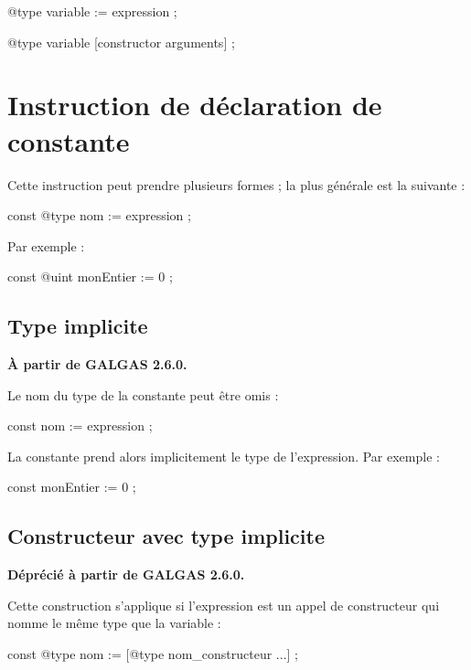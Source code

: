{
\begin{galgascode}
@type variable := expression ;
\end{galgascode}
}

{
\begin{galgascode}
@type variable [constructor arguments] ;
\end{galgascode}
}


\section{Instruction de déclaration de constante}

Cette instruction peut prendre plusieurs formes ; la plus générale est la suivante :
\begin{galgascode}
const @type nom := expression ;
\end{galgascode}

Par exemple :
\begin{galgascode}
const @uint monEntier := 0 ;
\end{galgascode}

\subsection{Type implicite}

\textbf{À partir de GALGAS 2.6.0.}


Le nom du type de la constante peut être omis :
\begin{galgascode}
const nom := expression ;
\end{galgascode}

La constante prend alors implicitement le type de l'expression. Par exemple :
\begin{galgascode}
const monEntier := 0 ;
\end{galgascode}



\subsection{Constructeur avec type implicite}

\textbf{Déprécié à partir de GALGAS 2.6.0.}

Cette construction s'applique si l'expression est un appel de constructeur qui nomme le même type que la variable :
\begin{galgascode}
const @type nom := [@type nom_constructeur ...] ;
\end{galgascode}

